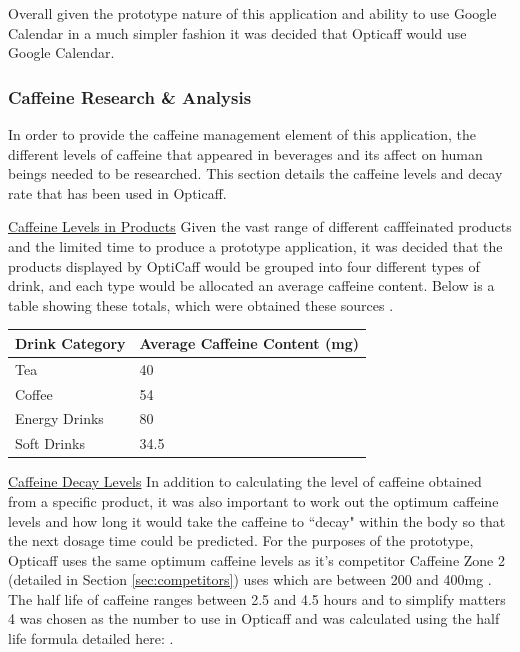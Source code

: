 Overall given the prototype nature of this application and ability to use Google Calendar in a much simpler fashion it was decided that Opticaff would use Google Calendar. 

\subsubsection{Caffeine Research \& Analysis} 
\label{sec:Caffeine}
In order to provide the caffeine management element of this application, the different levels of caffeine that appeared in beverages and its affect on human beings needed to be researched. This section details the caffeine levels and decay rate that has been used in Opticaff. 

\underline{Caffeine Levels in Products} \newline
Given the vast range of different cafffeinated products and the limited time to produce a prototype application, it was decided that the products displayed by OptiCaff would be grouped into four different types of drink, and each type would be allocated an average caffeine content. Below is a table showing these totals, which were obtained these sources \cite{Coke} \cite{TeaCoffee} \cite{EnergyDrink}.

\begin{center}
\begin{tabular}{|l|l|}
\hline
\textbf{Drink Category} & \textbf{Average Caffeine Content (mg)} \\\hline
Tea & 40 \\\hline
Coffee & 54 \\\hline
Energy Drinks & 80 \\\hline
Soft Drinks & 34.5 \\\hline
\end{tabular}
\end{center}

\underline{Caffeine Decay Levels} \newline
In addition to calculating the level of caffeine obtained from a specific product, it was also important to work out the optimum caffeine levels and how long it would take the caffeine to ``decay" within the body so that the next dosage time could be predicted. For the purposes of the prototype, Opticaff uses the same optimum caffeine levels as it's competitor Caffeine Zone 2 (detailed in Section \ref{sec:competitors}) uses which are between 200 and 400mg \cite{CaffeineZoneInfo}. The half life of caffeine ranges between 2.5 and 4.5 hours \cite{CaffeinePharmacology} \cite{CaffeinePharmacy} and to simplify matters 4 was chosen as the number to use in Opticaff and was calculated using the half life formula detailed here: \cite{HalfLife}.
 
